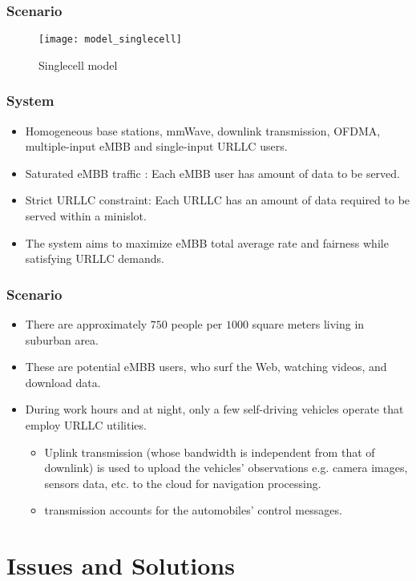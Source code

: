 \begin{frame}
  \frametitle{Scenario}
  \begin{figure}
    \texttt{[image: model\_singlecell]}
    \caption{Singlecell model}
  \end{figure}
\end{frame}

\begin{frame}
  \frametitle{System}
  \begin{itemize}
    \item Homogeneous base stations, mmWave, downlink transmission, OFDMA, multiple-input eMBB and single-input URLLC users.
    \item Saturated eMBB traffic \cite{S05}: Each eMBB user has  amount of data to be served.
    \item Strict URLLC constraint: Each URLLC has an amount of data required to be served within a minislot.
    \item The system aims to maximize eMBB total average rate and fairness while satisfying URLLC demands.
  \end{itemize}
\end{frame}

\begin{frame}
  \frametitle{Scenario}
  \begin{itemize}
    \item There are approximately $750$ people per $1000$ square meters living in suburban area\exampleFootnote \cite{F19}.
    \item These are potential eMBB users, who surf the Web, watching videos, and download data.
    \item During work hours and at night, only a few self-driving vehicles operate that employ URLLC utilities.
      \begin{itemize}
        \item Uplink transmission (whose bandwidth is independent from that of downlink) is used to upload the vehicles' observations e.g. camera images, sensors data, etc. to the cloud for navigation processing.
        \item {} transmission accounts for the automobiles' control messages.
      \end{itemize}
  \end{itemize}
\end{frame}

\section{Issues and Solutions}
